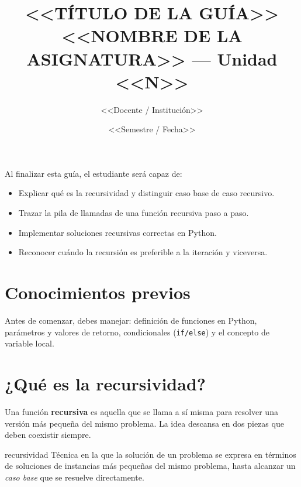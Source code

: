 \documentclass[11pt,a4paper]{article}
\title{\vspace{-1cm}\color{azulGuia}\textbf{<<TÍTULO DE LA GUÍA>>}\\[2mm]
  \large\normalcolor <<NOMBRE DE LA ASIGNATURA>> --- Unidad <<N>>}
\author{<<Docente / Institución>>}
\date{<<Semestre / Fecha>>}
\begin{document}
\maketitle
\thispagestyle{fancy}

\begin{objetivos}
Al finalizar esta guía, el estudiante será capaz de:
\begin{itemize}[leftmargin=1.4em,nosep]
  \item Explicar qué es la recursividad y distinguir caso base de caso recursivo.
  \item Trazar la pila de llamadas de una función recursiva paso a paso.
  \item Implementar soluciones recursivas correctas en Python.
  \item Reconocer cuándo la recursión es preferible a la iteración y viceversa.
\end{itemize}
\end{objetivos}

\section*{Conocimientos previos}
Antes de comenzar, debes manejar: definición de funciones en Python,
parámetros y valores de retorno, condicionales (\texttt{if/else}) y el concepto
de variable local.

\section{¿Qué es la recursividad?}

Una función \textbf{recursiva} es aquella que se llama a sí misma para resolver
una versión más pequeña del mismo problema. La idea descansa en dos piezas que
deben coexistir siempre.

\begin{definicion}{recursividad}
Técnica en la que la solución de un problema se expresa en términos de
soluciones de instancias más pequeñas del mismo problema, hasta alcanzar un
\emph{caso base} que se resuelve directamente.
\end{definicion}
\end{document}
